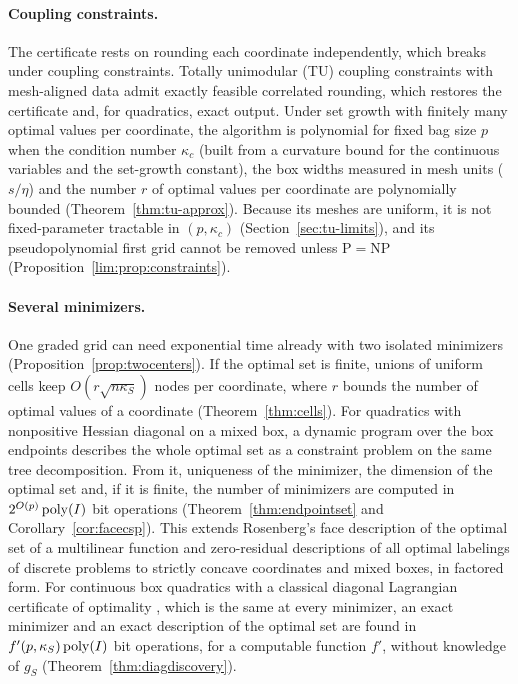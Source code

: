 \paragraph{Coupling constraints.}
The certificate rests on rounding each coordinate independently, which breaks
under coupling constraints. Totally unimodular (TU) coupling constraints with
mesh-aligned data admit exactly feasible correlated rounding, which restores
the certificate and, for quadratics, exact output. Under set growth with
finitely many optimal values per coordinate, the algorithm is polynomial for
fixed bag size $p$ when the condition number $\kappa_c$ (built from a
curvature bound for the continuous variables and the set-growth constant),
the box widths measured in mesh units ($s/\eta$) and the number $r$ of optimal values per coordinate are
polynomially bounded (Theorem~\ref{thm:tu-approx}). Because its meshes are
uniform, it is not fixed-parameter tractable in $(p,\kappa_c)$
(Section~\ref{sec:tu-limits}), and its pseudopolynomial first grid cannot be
removed unless P${}={}$NP (Proposition~\ref{lim:prop:constraints}).

\paragraph{Several minimizers.}
One graded grid can need exponential time already with two isolated
minimizers (Proposition~\ref{prop:twocenters}). If the optimal set is finite,
unions of uniform cells keep $O(r\sqrt{n\kappa_S})$ nodes per coordinate,
where $r$ bounds the number of optimal values of a coordinate
(Theorem~\ref{thm:cells}). For quadratics with nonpositive Hessian
diagonal on a mixed box, a dynamic program over the box endpoints describes
the whole optimal set as a constraint problem on the same tree decomposition.
From it, uniqueness of the minimizer, the dimension of the optimal set and,
if it is finite, the number of minimizers are computed in
$2^{O(p)}\operatorname{poly}(I)$ bit operations
(Theorem~\ref{thm:endpointset} and Corollary~\ref{cor:facecsp}). This
extends Rosenberg's face description of the optimal set of a multilinear
function \cite{Rosenberg1972} and zero-residual descriptions of all optimal
labelings of discrete problems \cite{WainwrightJaakkolaWillsky2005,Werner2007}
to strictly concave coordinates and mixed boxes, in factored form. For
continuous box quadratics with a classical diagonal Lagrangian certificate of
optimality \cite{JeyakumarRubinovWu2006,LiWuQuan2015}, which is the same at
every minimizer, an exact minimizer and an exact description of the optimal
set are found in $f'(p,\kappa_S)\operatorname{poly}(I)$ bit operations, for a computable function
$f'$, without knowledge of $g_S$ (Theorem~\ref{thm:diagdiscovery}).

